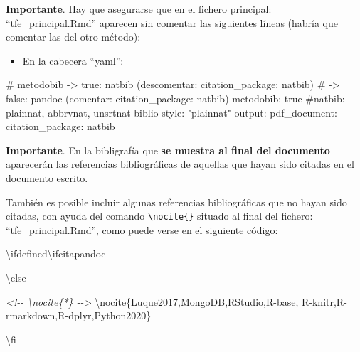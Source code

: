 \documentclass[12pt,a4paper,]{book}
\newenvironment{Shaded}{\begin{snugshade}}{\end{snugshade}}
\newcommand{\CommentTok}[1]{\textcolor[rgb]{0.56,0.35,0.01}{\textit{#1}}}
\newcommand{\FunctionTok}[1]{\textcolor[rgb]{0.00,0.00,0.00}{#1}}
\newcommand{\NormalTok}[1]{#1}
\providecommand{\tightlist}{%
  \setlength{\itemsep}{0pt}\setlength{\parskip}{0pt}}
\numberwithin{dummy}{section}
\theoremstyle{ocrenumbox}
\theoremstyle{blacknumex}
\theoremstyle{blacknumbox}
\theoremstyle{ocrenum}
\theoremstyle{ocrenum}
\begin{document}
\textbf{Importante}. Hay que asegurarse que en el fichero principal:
``tfe\_principal.Rmd'' aparecen sin comentar las siguientes líneas
(habría que comentar las del otro método):

\begin{itemize}
\tightlist
\item
  En la cabecera ``yaml'':
\end{itemize}

\footnotesize

\begin{Shaded}
\begin{Highlighting}[]
\FunctionTok{\# metodobib {-}\textgreater{} true: natbib (descomentar: citation\_package: natbib) }
\FunctionTok{\#           {-}\textgreater{} false: pandoc (comentar: citation\_package: natbib)}
\NormalTok{metodobib: true}
\NormalTok{\#natbib: plainnat, abbrvnat, unsrtnat}
\NormalTok{biblio{-}style: "plainnat"}
\NormalTok{output: }
\NormalTok{  pdf\_document: }
\NormalTok{    citation\_package: natbib}
\end{Highlighting}
\end{Shaded}

\normalsize

\textbf{Importante}. En la bibligrafía que \textbf{se muestra al final
del documento} aparecerán las referencias bibliográficas de aquellas que
hayan sido citadas en el documento escrito.

También es posible incluir algunas referencias bibliográficas que no
hayan sido citadas, con ayuda del comando
\texttt{\textbackslash{}nocite\{\}} situado al final del fichero:
``tfe\_principal.Rmd'', como puede verse en el siguiente código:

\footnotesize

\begin{Shaded}
\begin{Highlighting}[]
\NormalTok{\textbackslash{}ifdefined\textbackslash{}ifcitapandoc}

\NormalTok{\textbackslash{}else}

\CommentTok{\textless{}!{-}{-} \textbackslash{}nocite\{*\} {-}{-}\textgreater{}}
\NormalTok{\textbackslash{}nocite\{Luque2017,MongoDB,RStudio,R{-}base,}
\NormalTok{  R{-}knitr,R{-}rmarkdown,R{-}dplyr,Python2020\}}

\NormalTok{\textbackslash{}fi }
\end{Highlighting}
\end{Shaded}

\normalsize
\end{document}
